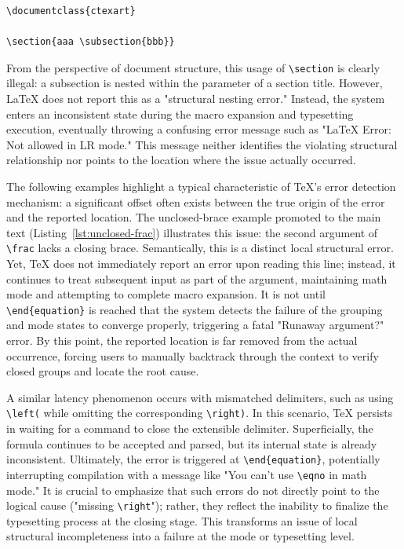 \begin{lstlisting}[caption={Nested section commands},label={lst:nested-section}]
\documentclass{ctexart}

\section{aaa \subsection{bbb}}

\end{lstlisting}

From the perspective of document structure, this usage of \texttt{\textbackslash section} is clearly illegal: a subsection is nested within the parameter of a section title. However, \LaTeX{} does not report this as a "structural nesting error." Instead, the system enters an inconsistent state during the macro expansion and typesetting execution, eventually throwing a confusing error message such as "LaTeX Error: Not allowed in LR mode." This message neither identifies the violating structural relationship nor points to the location where the issue actually occurred.

The following examples highlight a typical characteristic of \TeX{}'s error detection mechanism: a significant offset often exists between the true origin of the error and the reported location. The unclosed-brace example promoted to the main text (Listing~\ref{lst:unclosed-frac}) illustrates this issue: the second argument of \texttt{\textbackslash frac} lacks a closing brace. Semantically, this is a distinct local structural error. Yet, \TeX{} does not immediately report an error upon reading this line; instead, it continues to treat subsequent input as part of the argument, maintaining math mode and attempting to complete macro expansion. It is not until \texttt{\textbackslash end\{equation\}} is reached that the system detects the failure of the grouping and mode states to converge properly, triggering a fatal "Runaway argument?" error. By this point, the reported location is far removed from the actual occurrence, forcing users to manually backtrack through the context to verify closed groups and locate the root cause.

A similar latency phenomenon occurs with mismatched delimiters, such as using \texttt{\textbackslash left(} while omitting the corresponding \texttt{\textbackslash right)}. In this scenario, \TeX{} persists in waiting for a command to close the extensible delimiter. Superficially, the formula continues to be accepted and parsed, but its internal state is already inconsistent. Ultimately, the error is triggered at \texttt{\textbackslash end\{equation\}}, potentially interrupting compilation with a message like "You can't use \texttt{\textbackslash eqno} in math mode." It is crucial to emphasize that such errors do not directly point to the logical cause ("missing \texttt{\textbackslash right}"); rather, they reflect the inability to finalize the typesetting process at the closing stage. This transforms an issue of local structural incompleteness into a failure at the mode or typesetting level.


